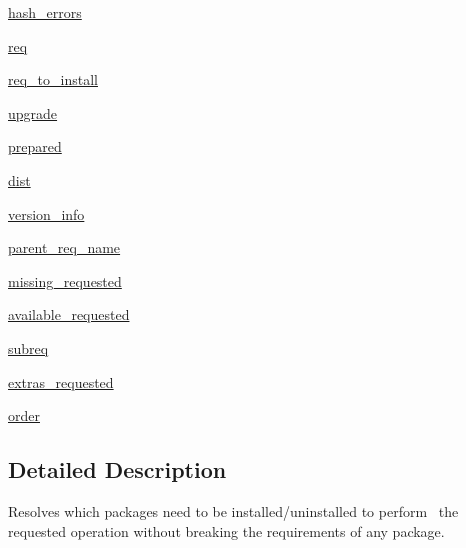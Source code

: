 \begin{DoxyCompactItemize}
\item 
\hyperlink{classpip_1_1__internal_1_1resolution_1_1legacy_1_1resolver_1_1Resolver_a2ba5cae58615555494120eea670e64fe}{hash\+\_\+errors}
\item 
\hyperlink{classpip_1_1__internal_1_1resolution_1_1legacy_1_1resolver_1_1Resolver_a017a3e11dad7f5e0e3b677fed6991eb6}{req}
\item 
\hyperlink{classpip_1_1__internal_1_1resolution_1_1legacy_1_1resolver_1_1Resolver_a539501bf7de847062d8dabdb1cc279bf}{req\+\_\+to\+\_\+install}
\item 
\hyperlink{classpip_1_1__internal_1_1resolution_1_1legacy_1_1resolver_1_1Resolver_a6cd5a8810758193ad700448a7f6072dd}{upgrade}
\item 
\hyperlink{classpip_1_1__internal_1_1resolution_1_1legacy_1_1resolver_1_1Resolver_a147bdd80c201e4cb8112a91cb7d86aa1}{prepared}
\item 
\hyperlink{classpip_1_1__internal_1_1resolution_1_1legacy_1_1resolver_1_1Resolver_a53c1466aff8881faefdff1c8dddb372a}{dist}
\item 
\hyperlink{classpip_1_1__internal_1_1resolution_1_1legacy_1_1resolver_1_1Resolver_a082956b85b35fc8eb310601cb95adea0}{version\+\_\+info}
\item 
\hyperlink{classpip_1_1__internal_1_1resolution_1_1legacy_1_1resolver_1_1Resolver_af5f034b04677ddb7ec495d28f9027c5c}{parent\+\_\+req\+\_\+name}
\item 
\hyperlink{classpip_1_1__internal_1_1resolution_1_1legacy_1_1resolver_1_1Resolver_a20f8386f1d1c8f29270b3f13b09cf5f6}{missing\+\_\+requested}
\item 
\hyperlink{classpip_1_1__internal_1_1resolution_1_1legacy_1_1resolver_1_1Resolver_a02af56d3ee0f7d99f2d054f838b8bf56}{available\+\_\+requested}
\item 
\hyperlink{classpip_1_1__internal_1_1resolution_1_1legacy_1_1resolver_1_1Resolver_a453131e88e1917b76fd9f7fd7b3fabcd}{subreq}
\item 
\hyperlink{classpip_1_1__internal_1_1resolution_1_1legacy_1_1resolver_1_1Resolver_ac945145ae349acad9a0afd93240ca25f}{extras\+\_\+requested}
\item 
\hyperlink{classpip_1_1__internal_1_1resolution_1_1legacy_1_1resolver_1_1Resolver_a5967471de2e314d8c2e15d93e235245b}{order}
\end{DoxyCompactItemize}


\subsection{Detailed Description}
\begin{DoxyVerb}Resolves which packages need to be installed/uninstalled to perform \
the requested operation without breaking the requirements of any package.
\end{DoxyVerb}
 


